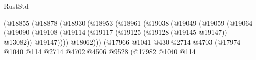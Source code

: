 \begin{lexlean}{RustStd}
\begin{coremodule}
                                                      (@18855
                                                        (@18878
                                                          (@18930
                                                            (@18953
                                                              (@18961
                                                                (@19038
                                                                  (@19049
                                                                    (@19059
                                                                      (@19064
                                                                        (@19090
                                                                          (@19108
                                                                            (@19114
                                                                              (@19117
                                                                                (@19125
                                                                                  (@19128
                                                                                    (@19145 @19147))
                                                                                  @13082))
                                                                              @19147))))
                                                                      @18062)))
                                                                (@17966
                                                                  @1041
                                                                  @430
                                                                  @2714
                                                                  @4703
                                                                  (@17974
                                                                    @1040
                                                                    @114
                                                                    @2714
                                                                    @4702
                                                                    @4506
                                                                    @9528
                                                                    (@17982
                                                                      @1040
                                                                      @114

\end{coremodule}
\end{lexlean}
